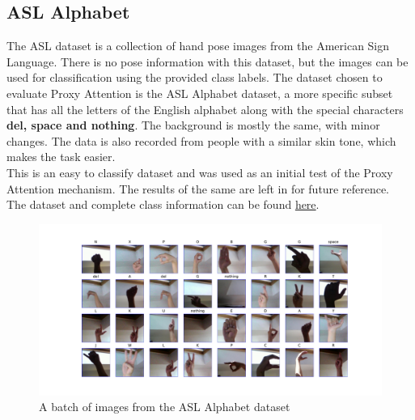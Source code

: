 \subsection{ASL Alphabet}
The ASL dataset is a collection of hand pose images from the American Sign Language. There is no pose information with this dataset, but the images can be used for classification using the provided class labels.
The dataset chosen to evaluate Proxy Attention is the ASL Alphabet dataset, a more specific subset that has all the letters of the English alphabet along with the special characters \textbf{del, space and nothing}. The background is mostly the same, with minor changes. The data is also recorded from people with a similar skin tone, which makes the task easier.\\
This is an easy to classify dataset and was used as an initial test of the Proxy Attention mechanism. The results of the same are left in for future reference. \\
The dataset and complete class information can be found \href{https://www.kaggle.com/datasets/grassknoted/asl-alphabet}{here}.
\begin{figure}[H]
    \centering
    \includegraphics[width=1\textwidth]{images/asl.pdf}
    \caption{A batch of images from the ASL Alphabet dataset}
    \label{fig:asl}

\end{figure}

